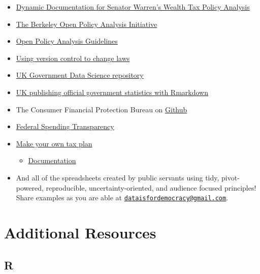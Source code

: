 \documentclass[
]{book}
\providecommand{\tightlist}{%
  \setlength{\itemsep}{0pt}\setlength{\parskip}{0pt}}
\begin{document}
\begin{itemize}
\tightlist
\item
  \href{http://wealthtaxsimulator.org/analysis/}{Dynamic Documentation for Senator Warren's Wealth Tax Policy Analysis}
\item
  \href{https://www.bitss.org/opa/}{The Berkeley Open Policy Analysis Initiative}
\item
  \href{https://www.bitss.org/wp-content/uploads/2019/03/OPA-Guidelines.pdf}{Open Policy Analysis Guidelines}
\item
  \href{https://arstechnica.com/tech-policy/2018/11/how-i-changed-the-law-with-a-github-pull-request/}{Using version control to change laws}
\item
  \href{https://github.com/ukgovdatascience}{UK Government Data Science repository}
\item
  \href{https://blog.revolutionanalytics.com/2017/03/uk-statistics.html}{UK publishing official government statistics with Rmarkdown}
\item
  The Consumer Financial Protection Bureau on \href{https://github.com/cfpb}{Github}
\item
  \href{https://fedspendingtransparency.github.io}{Federal Spending Transparency}
\item
  \href{https://taxjusticenow.org/\#/}{Make your own tax plan}

  \begin{itemize}
  \tightlist
  \item
    \href{https://eml.berkeley.edu/~saez/taxsimulator.pdf}{Documentation}
  \end{itemize}
\item
  And all of the spreadsheets created by public servants using tidy, pivot-powered, reproducible, uncertainty-oriented, and audience focused principles! Share examples as you are able at \href{mailto:dataisfordemocracy@gmail.com}{\nolinkurl{dataisfordemocracy@gmail.com}}.
\end{itemize}

\hypertarget{additional-resources}{%
\section{Additional Resources}\label{additional-resources}}

\hypertarget{r}{%
\subsection{R}\label{r}}
\end{document}
